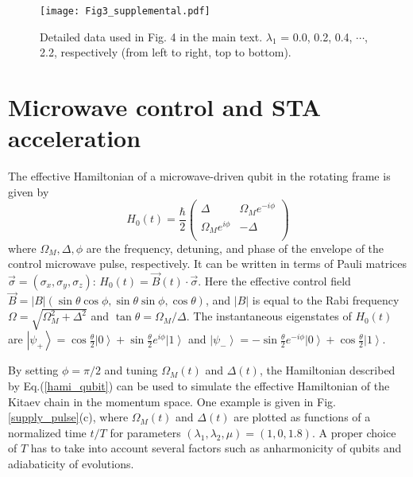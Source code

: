 \documentclass[aps,reprint,groupedaddress,showpacs,superscriptaddress]{revtex4-1}
\newcommand{\abs}[1]{\left| #1 \right|} %
\newcommand{\ket}[1]{\left| #1 \right>} %
\begin{document}
\begin{figure*}[!htbp]
	\centering
	\texttt{[image: Fig3\_supplemental.pdf]}
	\caption{Detailed data used in Fig. 4 in the main text. $\lambda_{1}$ = 0.0, 0.2, 0.4, $\cdots$, 2.2, respectively (from left to right, top to bottom). 
	}\label{supply_fig3}
\end{figure*}

\section{Microwave control and STA acceleration}
The effective Hamiltonian of a microwave-driven qubit in the rotating frame is given by 
\begin{equation}\label{hami_qubit}
H_0(t) = \frac{\hbar}{2}
\begin{pmatrix}
\Delta & \Omega_M e^{-i\phi}\\
\Omega_M e^{i\phi}  & -\Delta \\
\end{pmatrix}
\end{equation}
where $\Omega_M,\Delta,\phi$ are the frequency, detuning, and phase of the envelope of the control microwave pulse, respectively. It can be written in terms of Pauli matrices $\vec{\sigma} = (\sigma_{x},\sigma_{y},\sigma_{z})$: $H_0(t) = \vec{B}(t)\cdot \vec{\sigma}$. Here the effective control field $\vec{B}= \abs{B} (\sin\theta\cos\phi,\sin\theta\sin\phi,\cos\theta)$, and $\abs{B}$ is equal to the Rabi frequency $\Omega= \sqrt{\Omega_M^2 + \Delta^2}$ and $\tan \theta = \Omega_M/\Delta$. The instantaneous eigenstates of $H_0(t)$ are $\ket{\psi_+} = \cos\frac{\theta}{2}  \ket{0} +  \sin\frac{\theta}{2} e^{i\phi} \ket{1}$ and $\ket{\psi_-} = -\sin\frac{\theta}{2}  e^{-i\phi} \ket{0} + \cos\frac{\theta}{2}  \ket{1}$. 

By setting $\phi=\pi/2$ and tuning $\Omega_M(t)$ and $\Delta(t)$, the Hamiltonian described by Eq.(\ref{hami_qubit}) can be used to simulate the effective Hamiltonian of the Kitaev chain in the momentum space. One example is given in Fig. \ref{supply_pulse}(c), where $\Omega_M(t)$ and $\Delta(t)$ are plotted as functions of a normalized time $t/T$ for parameters $(\lambda_{1},\lambda_{2},\mu) = (1,0,1.8)$. A proper choice of $T$ has to take into account several factors such as anharmonicity of qubits and adiabaticity of evolutions. 
\end{document}
